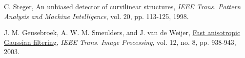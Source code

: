 \documentclass{article}
\begin{document}
\clearpage
\begin{thebibliography}{9}
\fontsize{10pt}{12pt}\selectfont
\raggedright

        C. Steger, An unbiased detector of curvilinear structures, 
        \emph{IEEE Trans. Pattern Analysis and Machine Intelligence},
        vol. 20, pp. 113-125, 1998.

        J. M. Geusebroek, A. W. M. Smeulders, and J. van de Weijer, 
        \ul{Fast anisotropic Gaussian filtering},
        \emph{IEEE Trans. Image Processing}, vol. 12, no. 8, pp. 938-943, 2003.


\end{thebibliography}


\end{document}
